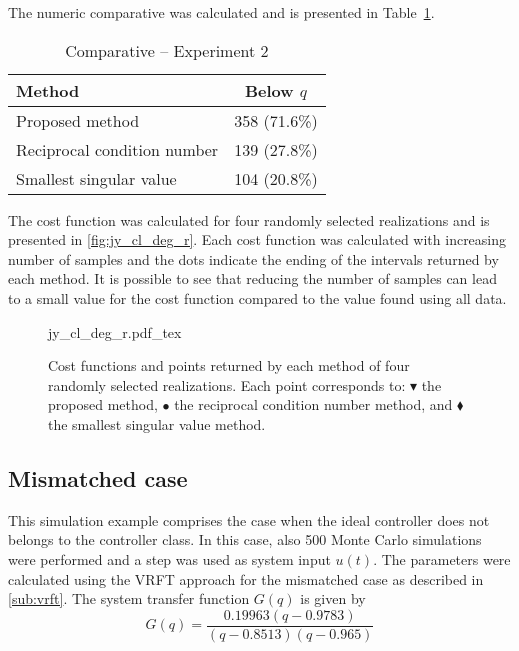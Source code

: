 The numeric comparative was calculated and is presented in Table~\ref{tab:comp_cl_deg_r}.
\begin{table}[h!]
\caption{Comparative -- Experiment 2 \label{tab:comp_cl_deg_r}}
\centering
\begin{tabular}{lc}
\toprule
Method & Below $q$\\
\midrule
Proposed method & 358 (71.6\%) \\
Reciprocal condition number & 139 (27.8\%) \\
Smallest singular value & 104 (20.8\%) \\
\bottomrule
\end{tabular}
\end{table}

The cost function was calculated for four randomly selected realizations and is presented in \autoref{fig:jy_cl_deg_r}.
Each cost function was calculated with increasing number of samples and the dots indicate the ending of the intervals returned by each method.
It is possible to see that reducing the number of samples can lead to a small value for the cost function compared to the value found using all data.
\begin{figure}[h!]
  \centering
  \def\svgwidth{\columnwidth}
  {\footnotesize{jy_cl_deg_r.pdf_tex}}
  \caption{\label{fig:jy_cl_deg_r} Cost functions and points returned by each method of four randomly selected realizations. Each point corresponds to: $\blacktriangledown$ the proposed method, $\bullet$ the reciprocal condition number method, and $\blacklozenge$ the smallest singular value method.}
\end{figure}

%
%

\subsection{Mismatched case}
This simulation example comprises the case when the ideal controller does not belongs to the controller class.
In this case, also 500 Monte Carlo simulations were performed and a step was used as system input $u(t)$.
The parameters were calculated using the VRFT approach for the mismatched case as described in \autoref{sub:vrft}.
The system transfer function $G(q)$ is given by
\[
	G(q) = \frac{0.19963 (q-0.9783)}{(q-0.8513) (q-0.965)}
\]

